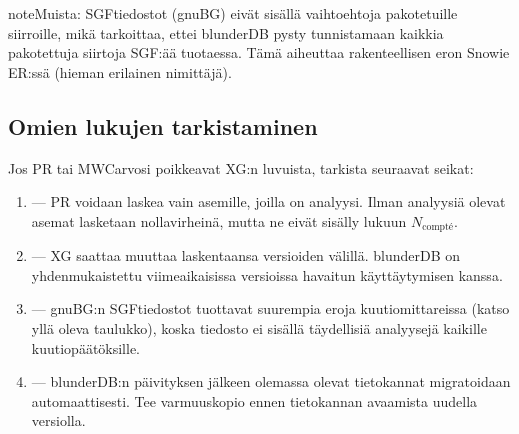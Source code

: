 \documentclass[letterpaper,10pt,finnish]{sphinxmanual}
\begin{document}
\begin{sphinxadmonition}{note}{Muista:}
\sphinxAtStartPar
SGF\sphinxhyphen{}tiedostot (gnuBG) eivät sisällä vaihtoehtoja pakotetuille siirroille, mikä tarkoittaa, ettei blunderDB pysty tunnistamaan kaikkia pakotettuja siirtoja SGF:ää tuotaessa. Tämä aiheuttaa rakenteellisen eron Snowie ER:ssä (hieman erilainen nimittäjä).
\end{sphinxadmonition}


\subsection{Omien lukujen tarkistaminen}
\label{\detokenize{stats_parity:valider-vos-propres-chiffres}}
\sphinxAtStartPar
Jos PR\sphinxhyphen{} tai MWC\sphinxhyphen{}arvosi poikkeavat XG:n luvuista, tarkista seuraavat seikat:
\begin{enumerate}
%
\item {} 
\sphinxAtStartPar
{} — PR voidaan laskea vain asemille, joilla on analyysi. Ilman analyysiä olevat asemat lasketaan nollavirheinä, mutta ne eivät sisälly lukuun \(N_\text{compté}\).

\item {} 
\sphinxAtStartPar
{} — XG saattaa muuttaa laskentaansa versioiden välillä. blunderDB on yhdenmukaistettu viimeaikaisissa versioissa havaitun käyttäytymisen kanssa.

\item {} 
\sphinxAtStartPar
{} — gnuBG:n SGF\sphinxhyphen{}tiedostot tuottavat suurempia eroja kuutiomittareissa (katso yllä oleva taulukko), koska tiedosto ei sisällä täydellisiä analyysejä kaikille kuutiopäätöksille.

\item {} 
\sphinxAtStartPar
{} — blunderDB:n päivityksen jälkeen olemassa olevat tietokannat migratoidaan automaattisesti. Tee varmuuskopio ennen tietokannan avaamista uudella versiolla.

\end{enumerate}
\end{document}
